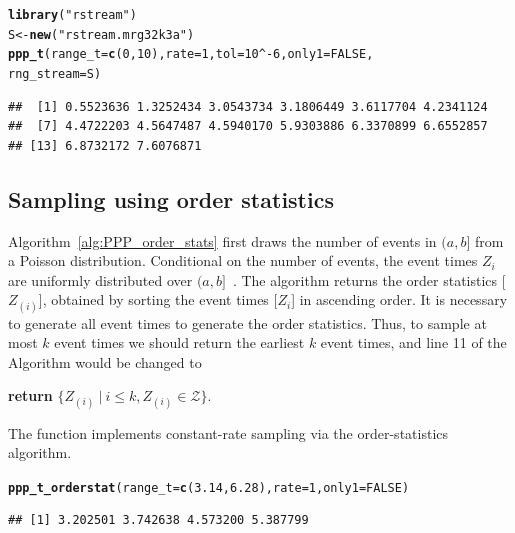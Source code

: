 \documentclass[article,nojss]{jss}\usepackage[]{graphicx}\usepackage[]{xcolor}
\makeatletter
\newcommand{\hlnum}[1]{\textcolor[rgb]{0.686,0.059,0.569}{#1}}%
\newcommand{\hlstr}[1]{\textcolor[rgb]{0.192,0.494,0.8}{#1}}%
\newcommand{\hlopt}[1]{\textcolor[rgb]{0,0,0}{#1}}%
\newcommand{\hlstd}[1]{\textcolor[rgb]{0.345,0.345,0.345}{#1}}%
\newcommand{\hlkwb}[1]{\textcolor[rgb]{0.69,0.353,0.396}{#1}}%
\newcommand{\hlkwc}[1]{\textcolor[rgb]{0.333,0.667,0.333}{#1}}%
\newcommand{\hlkwd}[1]{\textcolor[rgb]{0.737,0.353,0.396}{\textbf{#1}}}%
\newenvironment{kframe}{%
 \def\at@end@of@kframe{}%
 \ifinner\ifhmode%
  \def\at@end@of@kframe{\end{minipage}}%
  \begin{minipage}{\columnwidth}%
 \fi\fi%
 \def\FrameCommand##1{\hskip\@totalleftmargin \hskip-\fboxsep
 \colorbox{shadecolor}{##1}\hskip-\fboxsep
     \hskip-\linewidth \hskip-\@totalleftmargin \hskip\columnwidth}%
 \MakeFramed {\advance\hsize-\width
   \@totalleftmargin\z@ \linewidth\hsize
   \@setminipage}}%
 {\par\unskip\endMakeFramed%
 \at@end@of@kframe}
\newenvironment{knitrout}{}{} %
\newcommand{\fct}[1]{\code{#1()}}
\makeatother
\begin{document}
\begin{knitrout}
\color{fgcolor}\begin{kframe}
\begin{alltt}
\hlkwd{library}\hlstd{(}\hlstr{"rstream"}\hlstd{)}
\hlstd{S} \hlkwb{<-} \hlkwd{new}\hlstd{(}\hlstr{"rstream.mrg32k3a"}\hlstd{)}
\hlkwd{ppp_t}\hlstd{(}\hlkwc{range_t} \hlstd{=} \hlkwd{c}\hlstd{(}\hlnum{0}\hlstd{,} \hlnum{10}\hlstd{),} \hlkwc{rate} \hlstd{=} \hlnum{1}\hlstd{,} \hlkwc{tol} \hlstd{=} \hlnum{10}\hlopt{^-}\hlnum{6}\hlstd{,} \hlkwc{only1} \hlstd{=} \hlnum{FALSE}\hlstd{,}
  \hlkwc{rng_stream} \hlstd{= S)}
\end{alltt}
\begin{verbatim}
##  [1] 0.5523636 1.3252434 3.0543734 3.1806449 3.6117704 4.2341124
##  [7] 4.4722203 4.5647487 4.5940170 5.9303886 6.3370899 6.6552857
## [13] 6.8732172 7.6076871
\end{verbatim}
\end{kframe}
\end{knitrout}


\subsection{Sampling using order statistics}\label{sec:PPP_order_stats}


Algorithm~\ref{alg:PPP_order_stats} first draws the number of events in $(a, b]$ from a Poisson distribution. Conditional on the number of events, the event times $Z_i$ are uniformly distributed over $(a, b]$~\citep[par. 4.1]{cox1965theory}. The algorithm returns the order statistics [$Z_{(i)}$], obtained by sorting the event times [$Z_i$] in ascending order. It is necessary to generate all event times to generate the order statistics. Thus, to sample at most $k$ event times we should return the earliest $k$ event times, and line 11 of the Algorithm would be changed to
\begin{center}
\textbf{return} {$\{Z_{(i)} \ | \ i \le k, Z_{(i)} \in \mathcal{Z}\}$}.
\end{center}


The \fct{ppp\_t\_orderstat} function implements constant-rate sampling via the order-statistics algorithm.

\begin{knitrout}
\color{fgcolor}\begin{kframe}
\begin{alltt}
\hlkwd{ppp_t_orderstat}\hlstd{(}\hlkwc{range_t} \hlstd{=} \hlkwd{c}\hlstd{(}\hlnum{3.14}\hlstd{,} \hlnum{6.28}\hlstd{),} \hlkwc{rate} \hlstd{=} \hlnum{1}\hlstd{,} \hlkwc{only1} \hlstd{=} \hlnum{FALSE}\hlstd{)}
\end{alltt}
\begin{verbatim}
## [1] 3.202501 3.742638 4.573200 5.387799
\end{verbatim}
\end{kframe}
\end{knitrout}
\end{document}
